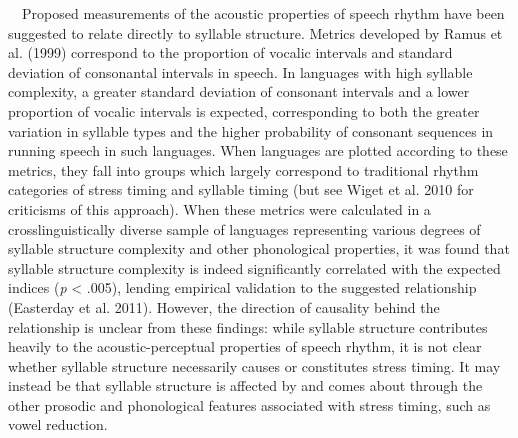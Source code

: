 \documentclass[12pt]{article}
\newenvironment{styleBody}{\renewcommand\baselinestretch{1.0}\setlength\leftskip{0in}\setlength\rightskip{0in plus 1fil}\setlength\parindent{0in}\setlength\parfillskip{0pt plus 1fil}\setlength\parskip{0in plus 1pt}\writerlistparindent\writerlistleftskip\leavevmode\normalfont\normalsize\fontsize{11pt}{13.2pt}\selectfont\mdseries\upshape\writerlistlabel\ignorespaces}{\unskip\vspace{0in plus 1pt}\par}
\newcommand\writerlistleftskip{}
\newcommand\writerlistparindent{}
\newcommand\writerlistlabel{}
\begin{document}
\begin{styleBody}
\ \ Proposed measurements of the acoustic properties of speech rhythm have been suggested to relate directly to syllable structure. Metrics developed by Ramus et al. (1999) correspond to the proportion of vocalic intervals and standard deviation of consonantal intervals in speech. In languages with high syllable complexity, a greater standard deviation of consonant intervals and a lower proportion of vocalic intervals is expected, corresponding to both the greater variation in syllable types and the higher probability of consonant sequences in running speech in such languages. When languages are plotted according to these metrics, they fall into groups which largely correspond to traditional rhythm categories of stress timing and syllable timing (but see Wiget et al. 2010 for criticisms of this approach). When these metrics were calculated in a crosslinguistically diverse sample of languages representing various degrees of syllable structure complexity and other phonological properties, it was found that syllable structure complexity is indeed significantly correlated with the expected indices (\textit{p} {\textless} .005), lending empirical validation to the suggested relationship (Easterday et al. 2011). However, the direction of causality behind the relationship is unclear from these findings: while syllable structure contributes heavily to the acoustic-perceptual properties of speech rhythm, it is not clear whether syllable structure necessarily causes or constitutes stress timing. It may instead be that syllable structure is affected by and comes about through the other prosodic and phonological features associated with stress timing, such as vowel reduction.
\end{styleBody}
\end{document}
